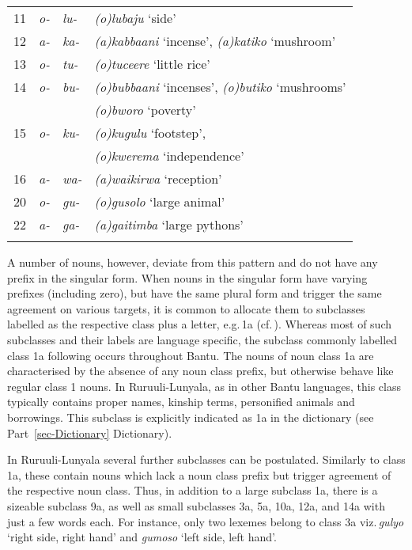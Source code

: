 \begin{table}
\begin{tabularx}{\textwidth}{X l X l }
11 & \textit{o-} & \textit{lu-} &   \textit{(o)lubaju} `side'\\ 

12 & \textit{a-} & \textit{ka-} &     \textit{(a)kabbaani} `incense', \textit{(a)katiko} ‘mushroom’\\

13 & \textit{o-} & \textit{tu-} & \textit{(o)tuceere} ‘little rice’\\

14 & \textit{o-} & \textit{bu-} &  \textit{(o)bubbaani} `incenses', \textit{(o)butiko} ‘mushrooms’\\
 &  &  &  \textit{(o)bworo} `poverty'\\
15 & \textit{o-} & \textit{ku-} &  \textit{(o)kugulu} `footstep', \\
 & 			 & 		 & \textit{(o)kwerema} `independence'\\
16 & \textit{a-} & \textit{wa-} &     \textit{(a)waikirwa} `reception'\\
20 & \textit{o-} & \textit{gu-} &    \textit{(o)gusolo} `large animal'\\
22 & \textit{a-} & \textit{ga-} &      \textit{(a)gaitimba} `large pythons'\\

\lspbottomrule
\end{tabularx}
\end{table}

A number of nouns, however, deviate from this pattern and do not have any prefix in the singular form. 
When nouns in the singular form have varying prefixes (including zero), but have the same plural form and trigger the same agreement on various targets, it is common to allocate them to subclasses labelled as the respective class plus a letter, e.g.\,1a (cf.\,\citealt{Vandeveldeetal2019Nominal}). 
Whereas most of such subclasses and their labels are language specific, the subclass commonly labelled class 1a following \citet{Doke1927Textbook} occurs throughout Bantu. 
The nouns of noun class 1a are characterised by the absence of any noun class prefix, but otherwise behave like regular class 1 nouns. 
In Ru\-ruu\-li-Lu\-nya\-la, as in other Bantu languages, this class typically contains proper names, kinship terms, personified animals and borrowings. 
This subclass is explicitly indicated as 1a in the dictionary (see Part~\ref{sec-Dictionary} Dictionary).

In Ru\-ruu\-li\hyp{}Lu\-nya\-la several further subclasses can be postulated. 
Similarly to class 1a, these contain nouns which lack a noun class prefix but trigger agreement of the respective noun class. 
Thus, in addition to a large subclass 1a, there is a sizeable subclass 9a, as well as small subclasses 3a, 5a, 10a, 12a, and 14a with just a few words each. 
For instance, only two lexemes belong to class 3a viz.\,\textit{gulyo} `right side, right hand' and \textit{gumoso} `left side, left hand'.

